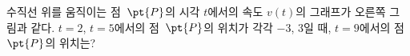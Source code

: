 \noindent\begin{minipage}[t]{0.58\linewidth}\vspace{0pt}\raggedright 수직선 위를 움직이는 점~$\pt{P}$의 시각 $t$에서의 속도 $v(t)$의 그래프가 오른쪽 그림과 같다. $t=2$, $t=5$에서의 점~$\pt{P}$의 위치가 각각 $-3$, $3$일 때, $t=9$에서의 점~$\pt{P}$의 위치는?\end{minipage}\hfill\begin{minipage}[t]{0.4\linewidth}\vspace{0pt}\centering \resizebox{\ifdim\width>\linewidth\linewidth\else\width\fi}{!}{}\end{minipage}\par
{}
